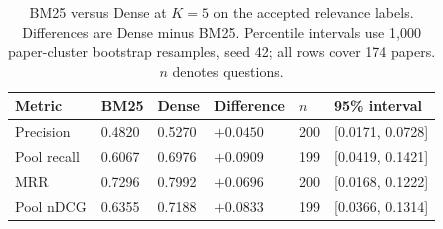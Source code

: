 \begin{table}[htbp]\centering\small
\caption{BM25 versus Dense at $K=5$ on the accepted relevance labels. Differences are Dense minus BM25. Percentile intervals use 1,000 paper-cluster bootstrap resamples, seed 42; all rows cover 174 papers. $n$ denotes questions.}\label{tab:bm25-dense-paired}
\begin{tabularx}{\linewidth}{YYYYYY}\toprule
Metric & BM25 & Dense & Difference & $n$ & 95\% interval\\\midrule
Precision & 0.4820 & 0.5270 & $+0.0450$ & 200 & [0.0171, 0.0728]\\
Pool recall & 0.6067 & 0.6976 & $+0.0909$ & 199 & [0.0419, 0.1421]\\
MRR & 0.7296 & 0.7992 & $+0.0696$ & 200 & [0.0168, 0.1222]\\
Pool nDCG & 0.6355 & 0.7188 & $+0.0833$ & 199 & [0.0366, 0.1314]\\\bottomrule\end{tabularx}
\end{table}

